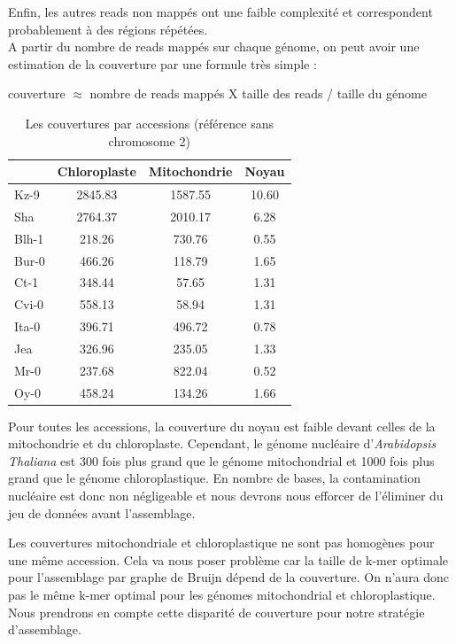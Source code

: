 \documentclass[a4paper]{article}
\begin{document}
Enfin, les autres reads non mappés ont une faible complexité et correspondent probablement à des régions répétées. \\

A partir du nombre de reads mappés sur chaque génome, on peut avoir une estimation de la couverture par une formule très simple : 

couverture $\approx$ nombre de reads mappés X taille des reads / taille du génome

\begin{table}[!ht]
\centering
\begin{tabular}{|l|ccc|}
  \hline
 & Chloroplaste & Mitochondrie & Noyau \\ 
  \hline
Kz-9 & 2845.83 & 1587.55 & 10.60 \\ 
  Sha & 2764.37 & 2010.17 & 6.28 \\ 
  Blh-1 & 218.26 & 730.76 & 0.55 \\ 
  Bur-0 & 466.26 & 118.79 & 1.65 \\ 
  Ct-1 & 348.44 & 57.65 & 1.31 \\ 
  Cvi-0 & 558.13 & 58.94 & 1.31 \\ 
  Ita-0 & 396.71 & 496.72 & 0.78 \\ 
  Jea & 326.96 & 235.05 & 1.33 \\ 
  Mr-0 & 237.68 & 822.04 & 0.52 \\ 
  Oy-0 & 458.24 & 134.26 & 1.66 \\ 
   \hline
\end{tabular}
\caption{Les couvertures par accessions (référence sans chromosome 2)}
\end{table}

Pour toutes les accessions, la couverture du noyau est faible devant celles de la mitochondrie et du chloroplaste. Cependant, le génome nucléaire d'\textit{Arabidopsis Thaliana} est 300 fois plus grand que le génome mitochondrial et 1000 fois plus grand que le génome chloroplastique. En nombre de bases, la contamination nucléaire est donc non négligeable et nous devrons nous efforcer de l'éliminer du jeu de données avant l'assemblage. 

Les couvertures mitochondriale et chloroplastique ne sont pas homogènes pour une même accession. Cela va nous poser problème car la taille de k-mer optimale pour l'assemblage par graphe de Bruijn dépend de la couverture. On n'aura donc pas le même k-mer optimal pour les génomes mitochondrial et chloroplastique. Nous prendrons en compte cette disparité de couverture pour notre stratégie d'assemblage.
\end{document}

